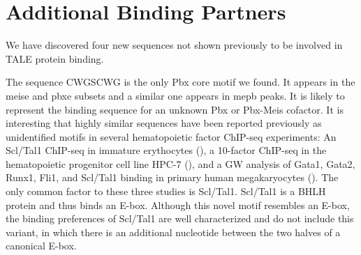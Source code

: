 

\section{Additional Binding Partners}

We have discovered four new sequences not shown previously to be involved in \ac{TALE} protein binding. 

The sequence CWGSCWG is the only Pbx core motif we found. It appears in the \ac{meise} and \ac{pbxe} subsets and a similar one appears in \ac{mepb} peaks. It is likely to represent the binding sequence for an unknown Pbx or Pbx-Meis cofactor. It is interesting that highly similar sequences have been reported previously as unidentified motifs in several hematopoietic factor ChIP-seq experiments: An Scl/Tal1 ChIP-seq in immature erythocytes (\cite{Kassouf2010}), a 10-factor ChIP-seq in the hematopoietic progenitor cell line HPC-7 (\cite{Wilson2010}), and a \ac{GW} analysis of Gata1, Gata2, Runx1, Fli1, and Scl/Tal1 binding in primary human megakaryocytes (\cite{Tijssen2011}). The only common factor to these three studies is Scl/Tal1. Scl/Tal1 is a \ac{BHLH} protein and thus binds an E-box. Although this novel motif resembles an E-box, the binding preferences of Scl/Tal1 are well characterized and do not include this variant, in which there is an additional nucleotide between the two halves of a canonical E-box. %

